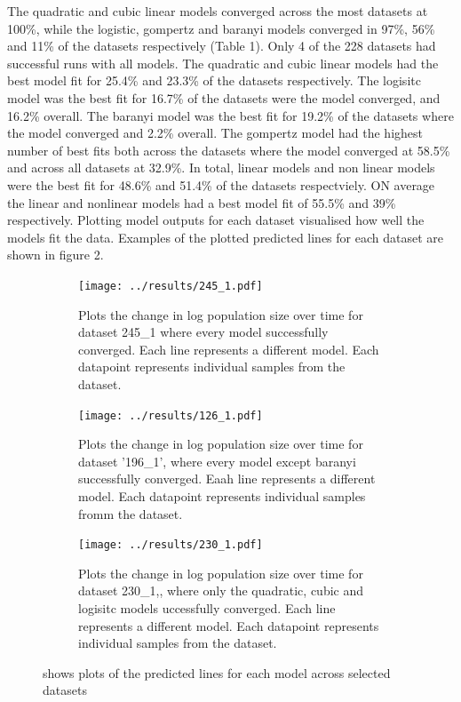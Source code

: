 \documentclass[titlepage]{article}
\begin{document}
The quadratic and cubic linear models converged across the most datasets at 100\%, while the logistic, gompertz and baranyi models converged in 97\%, 56\% and 11\% of the datasets respectively (Table 1). Only 4 of the 228 datasets had successful runs with all models. The quadratic and cubic linear models had the best model fit for 25.4\% and 23.3\% of the datasets respectively. The logisitc model was the best fit for 16.7\% of the datasets were the model converged, and 16.2\% overall. The baranyi model was the best fit for 19.2\% of the datasets where the model converged and 2.2\% overall. The gompertz model had the highest number of best fits both across the datasets where the model converged at 58.5\% and across all datasets at 32.9\%.  In total, linear models and non linear models were the best fit for 48.6\% and 51.4\% of the datasets respectviely. ON average the linear and nonlinear models had a best model fit of 55.5\% and 39\% respectively. Plotting model outputs for each dataset visualised how well the models fit the data. Examples of the plotted predicted lines for each dataset are shown in figure 2.

 \begin{figure}[H] 
  \centering
   \label{Figure 2}
\begin{subfigure}{.4\textwidth}
  \centering
  \texttt{[image: ../results/245\_1.pdf]}
    \caption{\footnotesize Plots the change in log population size over time for dataset 245\_1 where every model successfully converged. Each line represents a different model. Each datapoint represents individual samples from the dataset.}
  \label{fig2:Figure 2a}
\end{subfigure}
 \hspace{1em}
\begin{subfigure}{.4\textwidth}
  \centering
  \texttt{[image: ../results/126\_1.pdf]}
    \caption{\footnotesize Plots the change in log population size over time for dataset '196\_1', where every model except baranyi successfully converged. Eaah line represents a different model. Each datapoint represents individual samples fromm the dataset.}
  \label{fig2:Figure 2b}
\end{subfigure}
\vspace{1em}
\begin{subfigure}{.4\textwidth}
  \centering
  \texttt{[image: ../results/230\_1.pdf]}
    \caption{\footnotesize Plots the change in log population size over time for dataset 230\_1,, where only the quadratic, cubic and logisitc models uccessfully converged. Each line represents a different model. Each datapoint represents individual samples from the dataset.}
  \label{fig2:Figure 2c}
\end{subfigure}
\caption{\footnotesize shows plots of the predicted lines for each model across selected datasets}
\label{Figure 2}
\end{figure}
\end{document}
